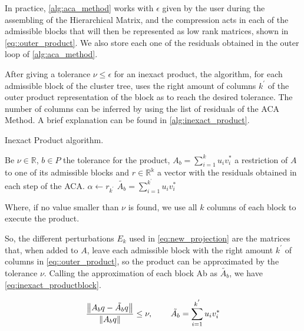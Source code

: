 

In practice, \ref{alg:aca_method} works with $\epsilon$ given by the user during the assembling of the Hierarchical Matrix, and the compression acts in each of the admissible blocks that will then be represented as low rank matrices, shown in \ref{eq::outer_product}. We also store each one of the residuals obtained in the outer loop of \ref{alg:aca_method}.

After giving a tolerance $\nu  \leq \epsilon$ for an inexact product, the algorithm, for each admissible block of the cluster tree, uses the right amount of columns $k^{'}$ of the outer product representation of the block as to reach the desired tolerance. The number of columns can be inferred by using the list of residuals of the ACA Method. A brief explanation can be found in \ref{alg:inexact_product}.

\begin{algorithm}
    \caption{Inexact Product algorithm.}\label{alg:inexact_product}
    \begin{algorithmic}[1]
        \State Be $\nu \in \mathbb{R}$, $b \in P$ the tolerance for the product,  $A_{b}= \sum_{i=1}^{k}u_{i}v_{i}^{*}$ a restriction of $A$ to one of its admissible blocks and $r \in \mathbb{R^{k}}$ a vector with the residuals obtained in each step of the ACA.
        \State $\alpha \leftarrow r_{k^{'}}$
        \If{$\alpha \leq \nu$}
        \State $\tilde{A_{b}}=\sum_{i=1}^{k^{'}}u_{i}v_{i}^{*}$
        \EndIf
        \EndFor

    \end{algorithmic}
\end{algorithm}

Where, if no value smaller than $\nu$ is found, we use all $k$ columns of each block to execute the product.

So, the different perturbations $E_{k}$ used in \ref{eq:new_projection} are the matrices that, when added to $A$, leave each admissible block with the right amount $k^{'}$ of columns in \ref{eq::outer_product}, so the product can be approximated by the tolerance $\nu$. Calling the approximation of each block \gls{Ab} as $\tilde{A_{b}}$, we have \ref{eq:inexact_productblock}.

\begin{equation}\label{eq:inexact_productblock}
    \frac{\left\lVert A_{b}q - \tilde{A_{b}}q \right\rVert}{\left\lVert A_{b}q\right\rVert} \leq \nu, \hspace{0.3in} \tilde{A_{b}} = \sum_{i=1} ^{k^{'}} u_{i} v_{i} ^{*}
\end{equation}



